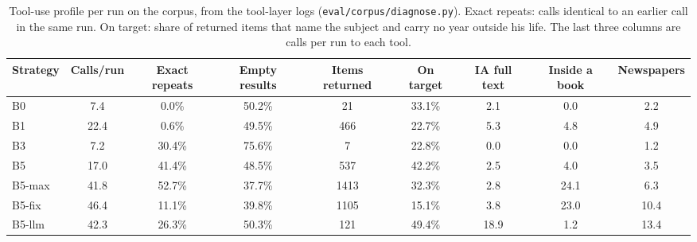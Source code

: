 \begin{table}[t]\centering\small
\begin{tabular}{@{}lcccccccc@{}}
\toprule
Strategy & Calls/run & Exact repeats & Empty results & Items returned & On target & IA full text & Inside a book & Newspapers \\
\midrule
B0 & 7.4 & 0.0\% & 50.2\% & 21 & 33.1\% & 2.1 & 0.0 & 2.2 \\
B1 & 22.4 & 0.6\% & 49.5\% & 466 & 22.7\% & 5.3 & 4.8 & 4.9 \\
B3 & 7.2 & 30.4\% & 75.6\% & 7 & 22.8\% & 0.0 & 0.0 & 1.2 \\
B5 & 17.0 & 41.4\% & 48.5\% & 537 & 42.2\% & 2.5 & 4.0 & 3.5 \\
B5-max & 41.8 & 52.7\% & 37.7\% & 1413 & 32.3\% & 2.8 & 24.1 & 6.3 \\
B5-fix & 46.4 & 11.1\% & 39.8\% & 1105 & 15.1\% & 3.8 & 23.0 & 10.4 \\
B5-llm & 42.3 & 26.3\% & 50.3\% & 121 & 49.4\% & 18.9 & 1.2 & 13.4 \\
\bottomrule
\end{tabular}
\caption{Tool-use profile per run on the corpus, from the tool-layer logs (\texttt{eval/corpus/diagnose.py}). Exact repeats: calls identical to an earlier call in the same run. On target: share of returned items that name the subject and carry no year outside his life. The last three columns are calls per run to each tool.}
\label{tab:diagnose}
\end{table}
